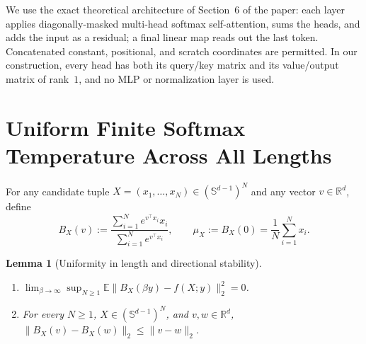 \documentclass[11pt]{article}
\theoremstyle{plain}
\newtheorem{lemma}[theorem]{Lemma}
\theoremstyle{definition}
\theoremstyle{remark}
\begin{document}
We use the exact theoretical architecture of Section~6 of the paper: each layer applies diagonally-masked multi-head softmax self-attention, sums the heads, and adds the input as a residual; a final linear map reads out the last token.
Concatenated constant, positional, and scratch coordinates are permitted.
In our construction, every head has both its query/key matrix and its value/output matrix of rank~$1$, and no MLP or normalization layer is used.

\section{Uniform Finite Softmax Temperature Across All Lengths}

For any candidate tuple $X = (x_1, \dots, x_N) \in (\mathbb{S}^{d-1})^N$ and any vector $v \in \mathbb{R}^d$, define
\[
B_X(v) := \frac{\sum_{i=1}^N e^{v^\top x_i} x_i}{\sum_{i=1}^N e^{v^\top x_i}},
\qquad
\mu_X := B_X(0) = \frac{1}{N}\sum_{i=1}^N x_i.
\]

\begin{lemma}[Uniformity in length and directional stability]\label{lem:uniform}
\begin{enumerate}[label=\textup{(\arabic*)}]
\item $\displaystyle \lim_{\beta \to \infty} \sup_{N \ge 1} \mathbb{E}\bigl\|B_X(\beta y) - f(X; y)\bigr\|_2^2 = 0$.
\item For every $N \ge 1$, $X \in (\mathbb{S}^{d-1})^N$, and $v, w \in \mathbb{R}^d$, $\|B_X(v) - B_X(w)\|_2 \le \|v - w\|_2$.
\end{enumerate}
\end{lemma}
\end{document}
